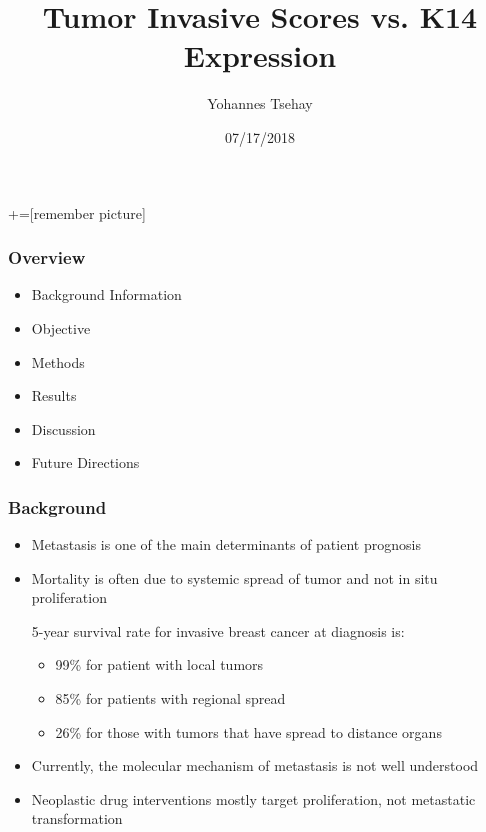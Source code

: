 \documentclass{beamer} %
\title{Tumor Invasive Scores vs. K14 Expression}
\author{Yohannes Tsehay}
\institute{Joel Bader's Lab}
\date{07/17/2018}
\begin{document}
+=[remember picture]

\everymath{\displaystyle}

\frame{\titlepage}

\begin{frame}
\frametitle{Overview}

\begin{itemize}
		\item Background Information
		\item Objective
		\item Methods
		\item Results
		\item Discussion
		\item Future Directions
\end{itemize}

\end{frame}


\begin{frame}
\frametitle{Background}

\begin{itemize}
		\item Metastasis is one of the main determinants of patient prognosis 
		\item Mortality is often due to systemic spread of tumor and not in situ proliferation
		\begin {Example}
		5-year survival rate for invasive breast cancer at diagnosis is:
		\begin {itemize}
	\item 99\% for patient with \alert{local tumors}
	\item 85\% for patients with \alert{regional spread}
	\item 26\% for those with \alert{tumors that have spread to distance organs} \cite{tarver2012cancer}
		\end {itemize}
		\end {Example}
		\item Currently, the molecular mechanism of metastasis is not well understood
		\item Neoplastic drug interventions mostly target proliferation, not metastatic transformation
\end{itemize}

\end{frame}
\end{document}
